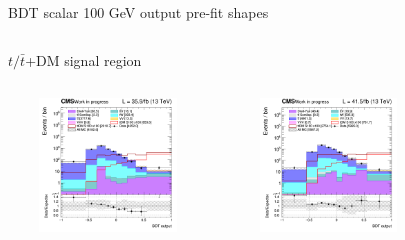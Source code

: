 \documentclass[8pt]{beamer}
\begin{document}
\begin{frame}{BDT scalar 100 GeV output pre-fit shapes}
\begin{columns}
\begin{column}{1.09\textwidth}
\begin{block}{\centering $t/\bar t$+DM signal region}\end{block} \vspace{10pt}
\end{column}
\end{columns} \vspace{-24pt}
\begin{columns}
		\begin{column}{0.33\textwidth}
			\begin{center}
			\begin{block}{}\end{block}	
     			\includegraphics[width=1.0\textwidth, height=100pt]{figs/2016/SmearSR-ttDM-scalar100/log_cratio_ST_topCR_ll_BDT_ttDM100_ST_BDT_output_scalar100_customBinsAttempt7.png}
    		\end{center}		
		\end{column} 
		\begin{column}{0.33\textwidth}
			\begin{center}
			\begin{block}{}\end{block}	
     			\includegraphics[width=1.0\textwidth, height=100pt]{figs/2017/SmearSR-ttDM-scalar100/log_cratio_ST_topCR_ll_BDT_ttDM100_ST_BDT_output_scalar100_customBinsAttempt7.png}
    		\end{center}		
		\end{column} 
		\begin{column}{0.33\textwidth}
			\begin{center}

\end{center}
\end{column}
\end{columns}
\end{frame}
\end{document}
